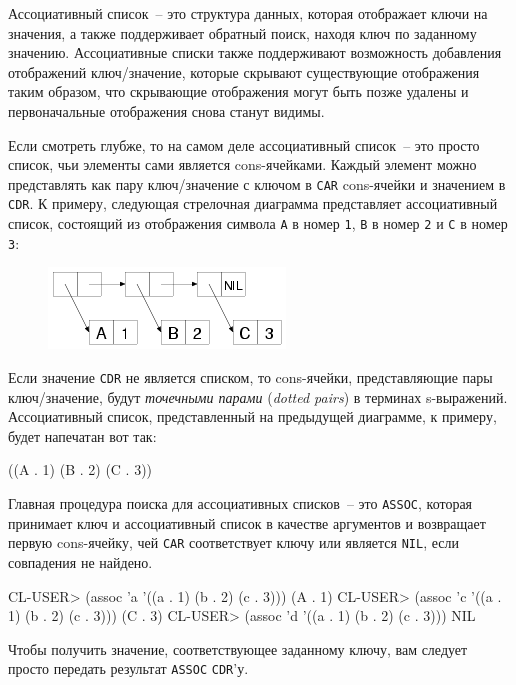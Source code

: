 Ассоциативный список~-- это структура данных, которая отображает ключи на значения, а также
поддерживает обратный поиск, находя ключ по заданному значению. Ассоциативные списки также
поддерживают возможность добавления отображений ключ/значение, которые скрывают
существующие отображения таким образом, что скрывающие отображения могут быть позже
удалены и первоначальные отображения снова станут видимы.

Если смотреть глубже, то на самом деле ассоциативный список~-- это просто список, чьи
элементы сами является cons-ячейками. Каждый элемент можно представлять как пару
ключ/значение с ключом в \lstinline{CAR} cons-ячейки и значением в \lstinline{CDR}. К примеру,
следующая стрелочная диаграмма представляет ассоциативный список, состоящий из отображения
символа \lstinline{A} в номер \lstinline{1}, \lstinline{B} в номер \lstinline{2} и \lstinline{C} в номер \lstinline{3}:

\begin{figure}[h]
  \centering
  \includegraphics[scale=0.6]{images/alist-abc-123.png}
\end{figure}

Если значение \lstinline{CDR} не является списком, то cons-ячейки, представляющие пары ключ/значение,
будут \textit{точечными парами} (\textit{dotted pairs}) в терминах s-выражений. Ассоциативный
список, представленный на предыдущей диаграмме, к примеру, будет напечатан вот так:

\begin{myverb}
((A . 1) (B . 2) (C . 3))
\end{myverb}

Главная процедура поиска для ассоциативных списков~-- это \lstinline{ASSOC}, которая принимает
ключ и ассоциативный список в качестве аргументов и возвращает первую cons-ячейку, чей
\lstinline{CAR} соответствует ключу или является \lstinline{NIL}, если совпадения не найдено.
  
\begin{myverb}
CL-USER> (assoc 'a '((a . 1) (b . 2) (c . 3)))
(A . 1)
CL-USER> (assoc 'c '((a . 1) (b . 2) (c . 3)))
(C . 3)
CL-USER> (assoc 'd '((a . 1) (b . 2) (c . 3)))
NIL
\end{myverb}

Чтобы получить значение, соответствующее заданному ключу, вам следует просто передать
результат \lstinline{ASSOC} \lstinline{СDR}'у.
  
